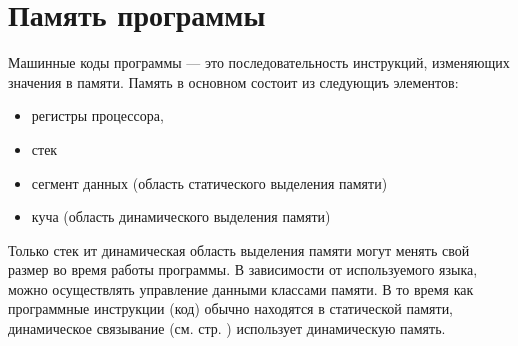 \section {Память программы}

Машинные коды программы --- это последовательность инструкций, изменяющих
значения в памяти. Память в основном состоит из следующиъ элементов:

\begin{itemize}
	\item регистры процессора,

	\item стек

	\item сегмент данных (область статического выделения памяти)

	\item куча (область динамического выделения памяти)
\end{itemize}

Только стек ит динамическая область выделения памяти могут менять свой размер
во время работы программы. В зависимости от используемого языка, можно
осуществлять управление данными классами памяти. В то время как программные
инструкции (код) обычно находятся в статической памяти, динамическое связывание
(см. стр. \cite{??}) использует динамическую память.
